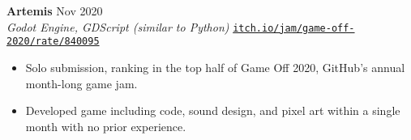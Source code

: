 \documentclass[letterpaper,10pt]{extarticle}
\begin{document}
\noindent
\textbf{Artemis} \hfill Nov 2020\\ %
\textit{Godot Engine, GDScript (similar to Python)} \hfill \texttt{\href{https://itch.io/jam/game-off-2020/rate/840095}{itch.io/jam/game-off-2020/rate/840095}}
\begin{itemize}
    \item Solo submission, ranking in the top half of Game Off 2020, GitHub's annual month-long game jam.
    \item Developed game including code, sound design, and pixel art within a single month with no prior experience.
\end{itemize}



\end{document}
